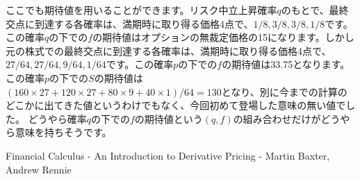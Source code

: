 \documentclass[uplatex,a4j,12pt,dvipdfmx]{jsarticle}
\begin{document}
ここでも期待値を用いることができます。リスク中立上昇確率$q$のもとで、最終交点に到達する各確率は、満期時に取り得る価格4点で、$1/8, 3/8, 3/8, 1/8$です。この確率$q$の下での$f$の期待値はオプションの無裁定価格の15になります。しかし元の株式での最終交点に到達する各確率は、満期時に取り得る価格4点で、$27/64, 27/64, 9/64, 1/64$です。この確率$p$の下での$f$の期待値は33.75となります。
この確率$p$の下での$S$の期待値は$(160 \times 27+120 \times 27+80 \times 9+40 \times 1)/64=130$となり、別に今までの計算のどこかに出てきた値というわけでもなく、今回初めて登場した意味の無い値でした。
どうやら確率$q$の下での$f$の期待値という$(q,f)$の組み合わせだけがどうやら意味を持ちそうです。


\begin{thebibliography}{9}
	Financial Calculus - An Introduction to Derivative Pricing - Martin Baxter, Andrew Rennie
\end{thebibliography}
\end{document}
